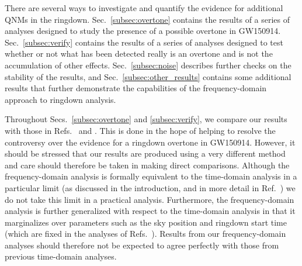 There are several ways to investigate and quantify the evidence for additional QNMs in the ringdown.
Sec.~\ref{subsec:overtone} contains the results of a series of analyses designed to study the presence of a possible overtone in GW150914.
Sec.~\ref{subsec:verify} contains the results of a series of analyses designed to test whether or not what has been detected really is an overtone and is not the accumulation of other effects.
Sec.~\ref{subsec:noise} describes further checks on the stability of the results, and
Sec.~\ref{subsec:other_results} contains some additional results that further demonstrate the capabilities of the frequency-domain approach to ringdown analysis.

Throughout Secs.~\ref{subsec:overtone} and \ref{subsec:verify}, we compare our results with those in Refs.~\cite{Cotesta:2022pci} and \cite{Isi:2022mhy}. 
This is done in the hope of helping to resolve the controversy over the evidence for a ringdown overtone in GW150914. 
However, it should be stressed that our results are produced using a very different method and care should therefore be taken in making direct comparisons.
Although the frequency-domain analysis is formally equivalent to the time-domain analysis in a particular limit (as discussed in the introduction, and in more detail in Ref.~\cite{Finch:2021qph}) we do not take this limit in a practical analysis. Furthermore, the frequency-domain analysis is further generalized with respect to the time-domain analysis in that it marginalizes over parameters such as the sky position and ringdown start time (which are fixed in the analyses of Refs.~\cite{Cotesta:2022pci, Isi:2022mhy}).
Results from our frequency-domain analyses should therefore not be expected to agree perfectly with those from previous time-domain analyses.

